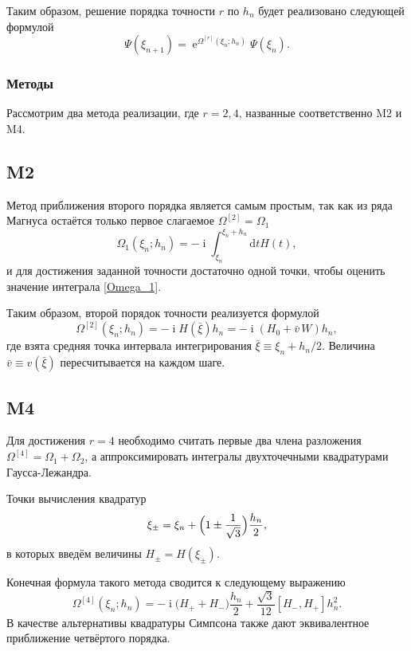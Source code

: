 \documentclass[12pt]{article}
\DeclareMathOperator{\Exp}{e}
\DeclareMathOperator\Iunit{i}
\renewcommand\exp\Exp
\renewcommand\imath\Iunit
\begin{document}
Таким образом, решение порядка точности $r$ по $h_n$ будет реализовано следующей
формулой
\begin{equation}
  \Psi(\xi_{n+1})=\exp^{\Omega^{[r]}(\xi_n;h_n)}\Psi(\xi_n).
\end{equation}
 
\subsubsection{Методы}

Рассмотрим два метода реализации, где $r=2,4$, названные соответственно M2 и M4.

\subsection*{M2}

Метод приближения второго порядка является самым простым, так как из ряда
Магнуса остаётся только первое слагаемое $\Omega^{[2]}=\Omega_1$
\begin{equation}\label{Omega_1}
  \Omega_1(\xi_n;h_n)=-\imath\int_{\xi_n}^{\xi_n+h_n}\text{d}t H(t),
\end{equation} 
и для достижения заданной точности достаточно одной точки, чтобы оценить
значение интеграла \eqref{Omega_1}.

Таким образом, второй порядок точности реализуется формулой
\begin{equation}
  \Omega^{[2]}(\xi_n;h_n)=-\imath H(\bar\xi)h_n=-\imath (H_0+\bar{v}\,W)h_n,
\end{equation}
где взята средняя точка интервала интегрирования
$\bar\xi\equiv\xi_n+h_n/2$. Величина $\bar{v}\equiv v(\bar\xi)$ пересчитывается
на каждом шаге.

\subsection*{M4}

Для достижения $r=4$ необходимо считать первые два члена разложения
$\Omega^{[4]}=\Omega_1 + \Omega_2$, а аппроксимировать интегралы двухточечными
квадратурами Гаусса-Лежандра.

Точки вычисления квадратур
\begin{equation}
  \xi_{\pm}=\xi_n+\Bigl(1\pm\frac{1}{\sqrt{3}}\Bigr)\frac{h_n}{2},
\end{equation} 
в которых введём величины $H_{\pm}=H(\xi_{\pm})$.

Конечная формула такого метода сводится к следующему выражению 
\begin{equation}\label{Omega4}
  \Omega^{[4]}(\xi_n;h_n)=-\imath\big(H_++H_-\big)\frac{h_n}{2}+
  \frac{\sqrt{3}}{12}[H_-,H_+]h^2_n.
\end{equation}
В качестве альтернативы квадратуры Симпсона также дают эквивалентное приближение
четвёртого порядка.
\end{document}

